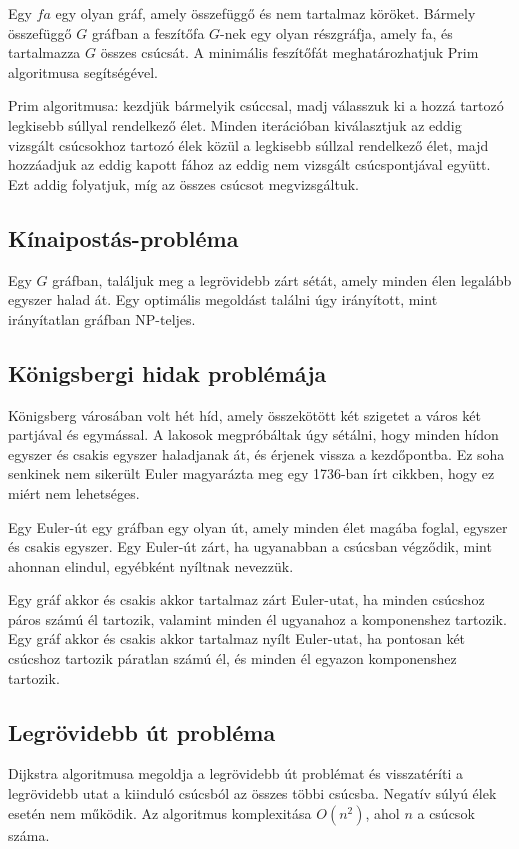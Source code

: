 Egy \(fa\) egy olyan gráf, amely összefüggő és nem tartalmaz köröket. Bármely összefüggő \(G\) gráfban a feszítőfa \(G\)-nek egy olyan részgráfja, amely fa, és tartalmazza \(G\) összes csúcsát. A minimális feszítőfát meghatározhatjuk Prim algoritmusa segítségével.

Prim algoritmusa: kezdjük bármelyik csúccsal, madj válasszuk ki a hozzá tartozó legkisebb súllyal rendelkező élet. Minden iterációban kiválasztjuk az eddig vizsgált csúcsokhoz tartozó élek közül a legkisebb súllzal rendelkező élet, majd hozzáadjuk az eddig kapott fához az eddig nem vizsgált csúcspontjával együtt. Ezt addig folyatjuk, míg az összes csúcsot megvizsgáltuk.

\subsection{Kínaipostás-probléma}

Egy \(G\) gráfban, találjuk meg a legrövidebb zárt sétát, amely minden élen legalább egyszer halad át. Egy optimális megoldást találni úgy irányított, mint irányítatlan gráfban NP-teljes.

\subsection{Königsbergi hidak problémája}

Königsberg városában volt hét híd, amely összekötött két szigetet a város két partjával és egymással. A lakosok megpróbáltak úgy sétálni, hogy minden hídon egyszer és csakis egyszer haladjanak át, és érjenek vissza a kezdőpontba. Ez soha senkinek nem sikerült Euler magyarázta meg egy 1736-ban írt cikkben, hogy ez miért nem lehetséges.

Egy Euler-út egy gráfban egy olyan út, amely minden élet magába foglal, egyszer és csakis egyszer. Egy Euler-út zárt, ha ugyanabban a csúcsban végződik, mint ahonnan elindul, egyébként nyíltnak nevezzük.

Egy gráf akkor és csakis akkor tartalmaz zárt Euler-utat, ha minden csúcshoz páros számú él tartozik, valamint minden él ugyanahoz a komponenshez tartozik. Egy gráf akkor és csakis akkor tartalmaz nyílt Euler-utat, ha pontosan két csúcshoz tartozik páratlan számú él, és minden él egyazon komponenshez tartozik.

\subsection{Legrövidebb út probléma}

Dijkstra algoritmusa megoldja a legrövidebb út problémat és visszatéríti a legrövidebb utat a kiinduló csúcsból az összes többi csúcsba. Negatív súlyú élek esetén nem működik. Az algoritmus komplexitása \(O(n^2)\), ahol \(n\) a csúcsok száma.

